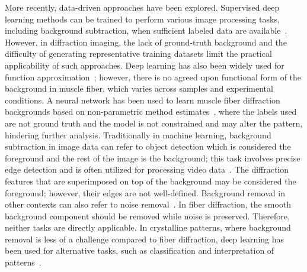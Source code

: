 \documentclass[iucr]{iucrjournals}
\begin{document}
More recently, data-driven approaches have been explored. Supervised deep learning methods can be trained to perform various image processing tasks, including background subtraction, when sufficient labeled data are available~\cite{archana2024dl_image_processing_review}. However, in diffraction imaging, the lack of ground-truth background and the difficulty of generating representative training datasets limit the practical applicability of such approaches. Deep learning has also been widely used for function approximation~\cite{devore2021nn_approximation}; however, there is no agreed upon functional form of the background in muscle fiber, which varies across samples and experimental conditions. A neural network has been used to learn muscle fiber diffraction backgrounds based on non-parametric method estimates~\cite{ArangurenCarmona2020}, where the labels used are not ground truth and the model is not constrained and may alter the pattern, hindering further analysis. Traditionally in machine learning, background subtraction in image data can refer to object detection which is considered the foreground and the rest of the image is the background; this task involves precise edge detection and is often utilized for processing video data~\cite{bouwmans2019dnn_background_subtraction}. The diffraction features that are superimposed on top of the background may be considered the foreground; however, their edges are not well-defined. Background removal in other contexts can also refer to noise removal~\cite{elad2023imagedenoisingdeeplearning}. In fiber diffraction, the smooth background component should be removed while noise is preserved. Therefore, neither tasks are directly applicable. In crystalline patterns, where background removal is less of a challenge compared to fiber diffraction, deep learning has been used for alternative tasks, such as classification and interpretation of patterns~\cite{szymanski2021probabilistic_multiphase_xrd, ziletti2018dl_crystal_classification, aguiar2020crystallographic_prediction}.

\end{document}
